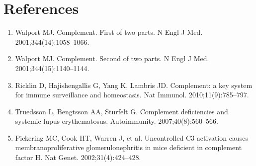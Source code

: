 \section*{References}
\begin{enumerate}
  \item Walport MJ. Complement. First of two parts. N Engl J Med. 2001;344(14):1058--1066.
  \item Walport MJ. Complement. Second of two parts. N Engl J Med. 2001;344(15):1140--1144.
  \item Ricklin D, Hajishengallis G, Yang K, Lambris JD. Complement: a key system for immune surveillance and homeostasis. Nat Immunol. 2010;11(9):785--797.
  \item Truedsson L, Bengtsson AA, Sturfelt G. Complement deficiencies and systemic lupus erythematosus. Autoimmunity. 2007;40(8):560--566.
  \item Pickering MC, Cook HT, Warren J, et al. Uncontrolled C3 activation causes membranoproliferative glomerulonephritis in mice deficient in complement factor H. Nat Genet. 2002;31(4):424--428.
\end{enumerate}

\clearpage
